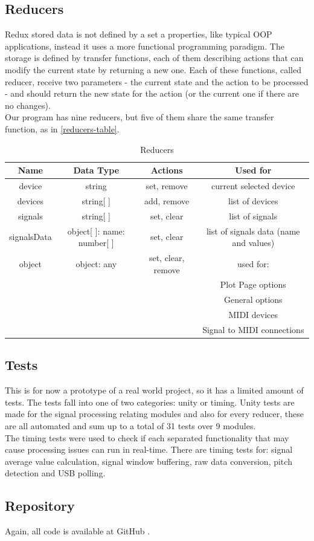 \subsection{Reducers}
Redux stored data is not defined by a set a properties, like typical OOP applications,
instead it uses a more functional programming paradigm. The storage is defined by transfer
functions, each of them describing actions that can modify the current state by
returning a new one. Each of these functions, called reducer, receive two parameters -
the current state and the action to be processed - and should return the new state
for the action (or the current one if there are no changes). \\
Our program has nine reducers, but five of them share the same transfer function,
as in \autoref{reducers-table}.
\begin{table}[htb]
  \ABNTEXreducedfont
  \caption[Reducers]{Reducers}
  \label{reducers-table}
  \centering
  \begin{tabular}{c|c|c|c}
    \textbf{Name} & \textbf{Data Type} & \textbf{Actions} & \textbf{Used for} \\
    \hline
		device & string & set, remove & current selected device \\
		\hline
		devices & string[ ] & add, remove & list of devices \\
		\hline
		signals & string[ ] & set, clear & list of signals \\
		\hline
		signalsData & object[ ]: {name: number[ ]} & set, clear & list of signals data (name and values) \\
		\hline
		object & object: any & set, clear, remove & used for: \\
																					& & & Plot Page options \\
																					& & & General options \\
																					& & & MIDI devices \\
																					& & & Signal to MIDI connections \\

  \end{tabular}
\end{table}

\subsection{Tests}
This is for now a prototype of a real world project, so it has a limited amount
of tests. The tests fall into one of two categories: unity or timing. Unity tests
are made for the signal processing relating modules and also for every reducer,
these are all automated and sum up to a total of 31 tests over 9 modules. \\
The timing tests were used to check if each separated functionality that may
cause processing issues can run in real-time. There are timing tests for: signal
average value calculation, signal window buffering, raw data conversion,
pitch detection and USB polling.

\subsection{Repository}
Again, all code is available at GitHub \cite{guitar-digitizer}.
